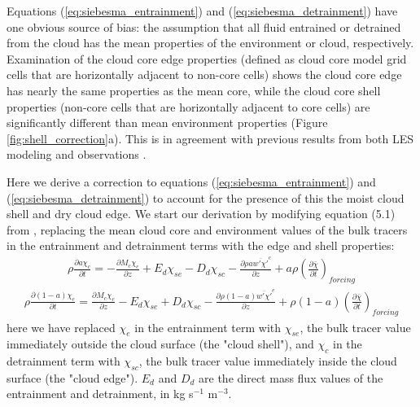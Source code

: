 \documentclass[draft,grl]{agutex}
\begin{document}
\begin{article}
Equations (\ref{eq:siebesma_entrainment}) and (\ref{eq:siebesma_detrainment}) 
have one obvious source of bias: the assumption that all fluid entrained or 
detrained from the cloud has the mean properties of the environment or cloud, 
respectively.  Examination of the cloud core edge properties (defined as cloud 
core model grid cells that are horizontally adjacent to non-core cells) shows 
the cloud core edge has nearly the same properties as the mean core, while the 
cloud core shell properties (non-core cells that are horizontally adjacent to 
core cells) are significantly different than mean environment properties 
(Figure \ref{fig:shell_correction}a).  This is in agreement with previous 
results from both LES modeling and observations \citep{Heus2008}.
  
Here we derive a correction to equations (\ref{eq:siebesma_entrainment}) and 
(\ref{eq:siebesma_detrainment}) to account for the presence of this the moist 
cloud shell and dry cloud edge.  We start our derivation by modifying equation 
(5.1) from \cite{Siebesma1995}, replacing the mean cloud core and environment 
values of the bulk tracers in the entrainment and detrainment terms with the 
edge and shell properties:
\begin{eqnarray}
  \label{eq:entrainment_derivation_1}
    \rho \frac{\partial a \chi_c}{\partial t} 
    = - \frac{\partial M_c \chi_c}{\partial z} 
    + E_d \chi_{se} - D_d \chi_{sc} 
    - \frac{\partial \rho a \overline{w' \chi'}^c}{\partial z} 
    + a \rho \left(\frac{\partial \bar{\chi}}{\partial t}\right)_{forcing}
\end{eqnarray}
\begin{eqnarray}
  \label{eq:detrainment_derivation_1}
    \rho \frac{\partial (1 - a) \chi_e}{\partial t}
    = \frac{\partial M_c \chi_e}{\partial z} 
    - E_d \chi_{se} + D_d \chi_{sc} 
    - \frac{\partial \rho (1 - a) \overline{w' \chi'}^e}{\partial z} 
    + \rho (1 - a) \left(\frac{\partial \bar{\chi}}{\partial t}\right)_{forcing}
\end{eqnarray}
here we have replaced $\chi_e$ in the entrainment term with $\chi_{se}$, the 
bulk tracer value immediately outside the cloud surface (the "cloud shell"), and 
$\chi_c$ in the detrainment term with $\chi_{sc}$, the bulk tracer value 
immediately inside the cloud surface (the "cloud edge").  $E_d$ and $D_d$ are 
the direct mass flux values of the entrainment and detrainment, in kg s$^{-1}$ 
m$^{-3}$.


\end{article}
\end{document}
